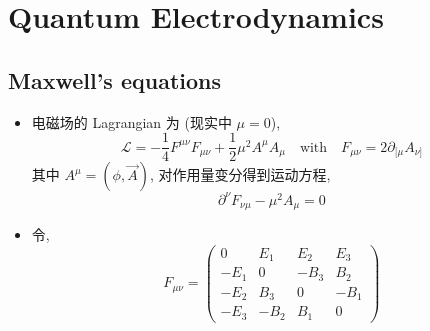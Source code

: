 \chapter{Quantum Electrodynamics}
\section{Maxwell's equations}
\begin{itemize}
	\item 电磁场的 Lagrangian 为 (现实中 $\mu = 0$),
	\begin{equation}
		\mathcal{L} = - \frac{1}{4} F^{\mu \nu} F_{\mu \nu} + \frac{1}{2} \mu^2 A^\mu A_\mu \quad \text{with} \quad F_{\mu \nu} = 2 \partial_{[\mu} A_{\nu]}
	\end{equation}
	其中 $A^\mu = (\phi, \vec{A})$, 对作用量变分得到运动方程,
	\begin{equation}
		\partial^\nu F_{\nu \mu} - \mu^2 A_\mu = 0
	\end{equation}
	
	\item 令,
	\begin{equation}
		F_{\mu \nu} = \begin{pmatrix}
			0 & E_1 & E_2 & E_3 \\
			- E_1 & 0 & - B_3 & B_2 \\
			- E_2 & B_3 & 0 & - B_1 \\
			- E_3 & - B_2 & B_1 & 0
		\end{pmatrix}
	\end{equation}
\end{itemize}
